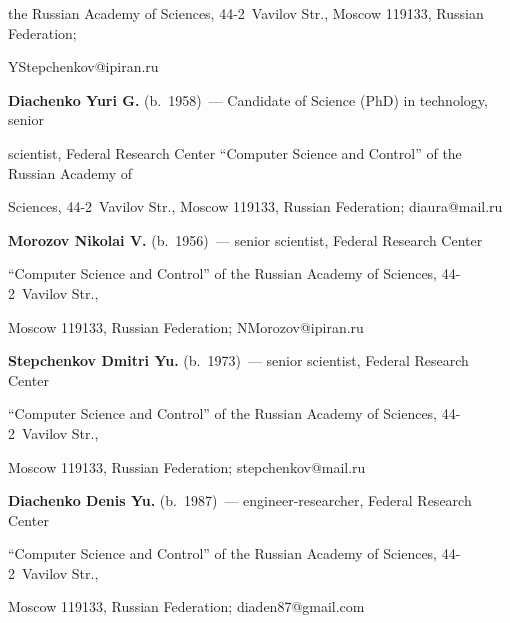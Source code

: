the Russian Academy of Sciences, 44-2~Vavilov Str., Moscow 119133, Russian Federation; 

\mbox{YStepchenkov@ipiran.ru}



\pagebreak

   


   

   \noindent

   \textbf{Diachenko Yuri G.} (b.\ 1958)~--- Candidate of Science (PhD) in technology, senior 

scientist, Federal Research Center ``Computer Science and Control'' of the Russian Academy of 

Sciences, 44-2~Vavilov Str., Moscow 119133, Russian Federation; \mbox{diaura@mail.ru}

   

   \vspace*{3pt}

   

   \noindent

   \textbf{Morozov Nikolai V.} (b.\ 1956)~--- senior scientist, Federal Research Center 

``Computer Science and Control'' of the Russian Academy of Sciences, 44-2~Vavilov Str., 

Moscow 119133, Russian Federation; \mbox{NMorozov@ipiran.ru}

   

   \vspace*{3pt}

   

   \noindent

   \textbf{Stepchenkov Dmitri Yu.} (b.\ 1973)~--- senior scientist, Federal Research Center 

``Computer Science and Control'' of the Russian Academy of Sciences, 44-2~Vavilov Str., 

Moscow 119133, Russian Federation; \mbox{stepchenkov@mail.ru}

   

   \vspace*{3pt}

   

   \noindent

   \textbf{Diachenko Denis Yu.} (b.\ 1987)~--- engineer-researcher, Federal Research Center 

``Computer Science and Control'' of the Russian Academy of Sciences, 44-2~Vavilov Str., 

Moscow 119133, Russian Federation; \mbox{diaden87@gmail.com}



\label{end\stat}



\renewcommand{\bibname}{\protect\rm Литература}

